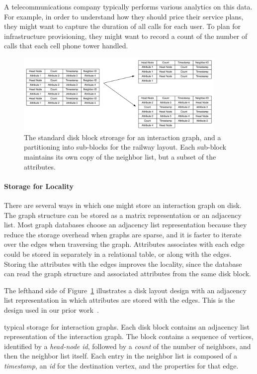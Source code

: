 A telecommunications company typically performs various analytics on this
data. For example, in order to understand how they should price their service
plans, they might want to capture the duration of all calls for each user. To
plan for infrastructure provisioning, they might want to record a count of the
number of calls that each cell phone tower handled.




\begin{figure}[ht]
\includegraphics[width=0.9\textwidth]{figures/before_after.pdf} 
 \caption{The standard disk block strorage for an interaction graph, and a
   partitioning into sub-blocks for the railway layout. Each sub-block maintains
 its own copy of the neighbor list, but a subset of the attributes.}
 \label{fig:before_after}
 \end{figure}

\paragraph*{Storage for Locality}
%
There are several ways in which one might store an interaction graph on
disk. The graph structure can be stored as a matrix representation or an
adjacency list. Most graph databases choose an adjacency list representation
because they reduce the storage overhead when graphs are sparse, and it is
faster to iterate over the edges when traversing the graph.  Attributes
associates with each edge could be stored in separately in a relational table,
or along with the edges. Storing the attributes with the edges improves the
locality, since the database can read the graph structure and associated
attributes from the same disk block. 


The lefthand side of Figure~\ref{fig:before_after} illustrates a disk layout
design with an adjacency list representation in which attributes are stored with
the edges. This is the design used in our prior work~\cite{gedik14}.


 typical storage for interaction graphs.
Each disk block contains an adjacency list representation of the interaction
graph. The block contains a sequence of vertices, identified by a
\emph{head-node id}, followed by a \emph{count} of the number of neighbors, and
then the neighbor list itself. Each entry in the neighbor list is composed of a
\emph{timestamp}, an \emph{id} for the destination vertex, and the properties
for that edge. 




